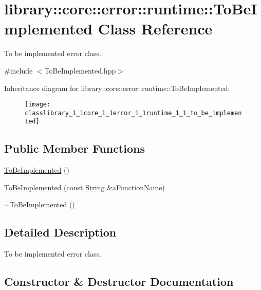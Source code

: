 \hypertarget{classlibrary_1_1core_1_1error_1_1runtime_1_1_to_be_implemented}{}\section{library\+:\+:core\+:\+:error\+:\+:runtime\+:\+:To\+Be\+Implemented Class Reference}
\label{classlibrary_1_1core_1_1error_1_1runtime_1_1_to_be_implemented}


To be implemented error class.  




{\ttfamily \#include $<$To\+Be\+Implemented.\+hpp$>$}

Inheritance diagram for library\+:\+:core\+:\+:error\+:\+:runtime\+:\+:To\+Be\+Implemented\+:\begin{figure}[H]
\begin{center}
\leavevmode
\texttt{[image: classlibrary\_1\_1core\_1\_1error\_1\_1runtime\_1\_1\_to\_be\_implemented]}
\end{center}
\end{figure}
\subsection*{Public Member Functions}
\begin{DoxyCompactItemize}
\item 
\hyperlink{classlibrary_1_1core_1_1error_1_1runtime_1_1_to_be_implemented_aa98b3ae5c0ee3329a09b4b03bf27cf85}{To\+Be\+Implemented} ()
\item 
\hyperlink{classlibrary_1_1core_1_1error_1_1runtime_1_1_to_be_implemented_aee7854f221ff5bdade9cb8d67267b6ba}{To\+Be\+Implemented} (const \hyperlink{classlibrary_1_1core_1_1types_1_1_string}{String} \&a\+Function\+Name)
\item 
\hyperlink{classlibrary_1_1core_1_1error_1_1runtime_1_1_to_be_implemented_a4d6d8204b46f1f5eb41458849a891787}{$\sim$\+To\+Be\+Implemented} ()
\end{DoxyCompactItemize}


\subsection{Detailed Description}
To be implemented error class. 

\subsection{Constructor \& Destructor Documentation}
\mbox{\label{classlibrary_1_1core_1_1error_1_1runtime_1_1_to_be_implemented_aa98b3ae5c0ee3329a09b4b03bf27cf85}} 
